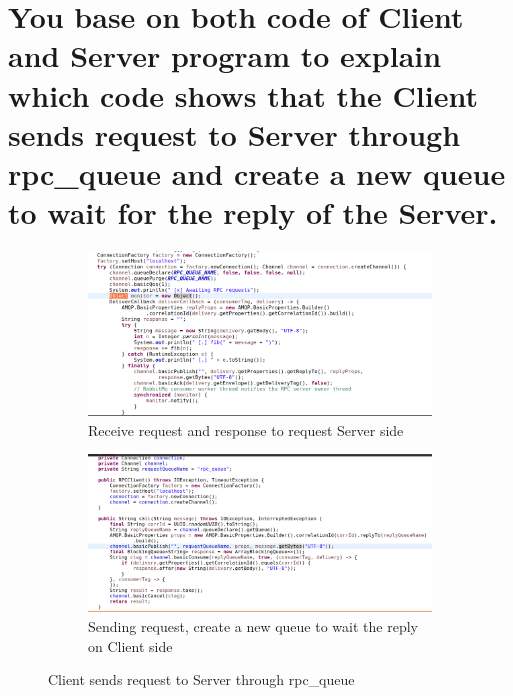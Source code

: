 \documentclass[11pt,a4paper]{report}
\begin{document}
	\section{You base on both code of Client and Server program to explain which code shows that the Client sends request to Server through rpc\_queue and create a new queue to wait for the reply of the Server.}
	\begin{figure}[h!]
		\centering
  		\begin{subfigure}[b]{0.4\linewidth}
  		\includegraphics[width=\linewidth]{server-rpc-queue.png}
    		\caption{Receive request and response to request Server side}
  		\end{subfigure}
  		\begin{subfigure}[b]{0.4\linewidth}
    		\includegraphics[width=\linewidth]{client-rpc-queue.png}
    		\caption{Sending request, create a new queue to wait the reply on Client side}
  		\end{subfigure}
  		\caption{Client sends request to Server through rpc\_queue}
  		\label{fig:rpc}
	\end{figure}
	
\end{document}
